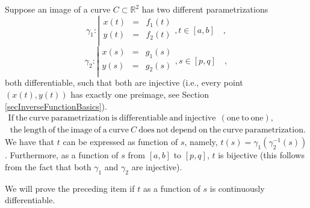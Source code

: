 \documentclass[12pt]{book}
\newcommand{\importantFormula}[1]{\begin{equation} \boxed{#1} \end{equation}}
\begin{document}
Suppose an image of a curve $C\subset \mathbb R^2$ has two different parametrizations 
\begin{equation}\label{eqDefCurve1}
\gamma_1:\left| 
\begin{array}{rcl}
x(t)&=&f_1(t)\\
y(t)&=&f_2(t)\\
\end{array}\right., t\in [a,b]\quad ,
\end{equation}
\begin{equation}\label{eqDefCurve2}
\gamma_2:\left| 
\begin{array}{rcl}
x(s)&=&g_1(s)\\
y(s)&=&g_2(s)\\
\end{array}\right. , s\in [p,q]\quad ,
\end{equation}
both differentiable, such that both are injective (i.e., every point $(x(t), y(t))$ has exactly one preimage, see Section \ref{secInverseFunctionBasics}). 
\importantFormula{
\begin{array}{c}
\mathrm{If~the~curve~parametrization~is~differentiable~and~injective~~(one~to~one),}\\
\mathrm{~the~length~of~the~image~of~a~curve~}C
\mathrm{~does~not~depend~on~the~curve~parametrization.}
\end{array}
}
We have that $t$ can be expressed as function of $s$, namely, $t(s)= \gamma_1(\gamma_2^{-1}(s))$. Furthermore, as a function of $s$ from $[a,b]$ to $[p,q]$, $t$ is bijective (this follows from the fact that both $\gamma_1$ and $\gamma_2$ are injective).

We will prove the preceding item if $t$ as a function of $s$ is  continuously differentiable.
\end{document}
